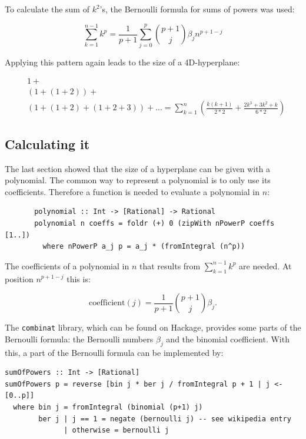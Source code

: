 \documentclass{tmr}
\begin{document}
To calculate the sum of $k^2$'s, the Bernoulli formula for sums of powers was used:

\begin{equation} \label{bernoulli}
\boxed{
\sum_{k=1}^{n-1} k^p = \frac{1}{p+1} \sum_{j=0}^{p} \binom{p+1}{j} \beta_{j} n^{p+1-j}
}
\end{equation}

Applying this pattern again leads to the size of a 4D-hyperplane:

\begin{equation}\label{poly4d}
\begin{split}
 & 1 +\\
 &(1+(1+2) )+ \\
 &(1+(1+2)+(1+2+3)) + ... = \sum_{k=1}^{n} (\frac{ k (k+1) }{2*2}  + \frac{2k^3+3k^2+k}{6*2})
\end{split}
\end{equation}

\subsection {Calculating it}

The last section showed that the size of a hyperplane can be given with a polynomial. The common way to represent a polynomial is to only use its coefficients. Therefore a function is needed to evaluate a polynomial in $n$:
\small
\begin{Verbatim}
       polynomial :: Int -> [Rational] -> Rational
       polynomial n coeffs = foldr (+) 0 (zipWith nPowerP coeffs [1..])
         where nPowerP a_j p = a_j * (fromIntegral (n^p))
\end{Verbatim}

The coefficients of a polynomial in $n$ that results from $\sum_{k=1}^{n-1} k^p$ are needed. At position $n^{p+1-j}$ this is:

\begin{equation} \label{coefficient}
\mbox{coefficient}(j) = \frac{1}{p+1} \binom{p+1}{j} \beta_{j}.
\end{equation}

The \verb|combinat| library, which can be found on Hackage, provides some parts of the Bernoulli formula: the Bernoulli numbers $\beta_{j}$ and the binomial coefficient. With this, a part of the Bernoulli formula can be implemented by:

\small
\begin{Verbatim}
sumOfPowers :: Int -> [Rational]
sumOfPowers p = reverse [bin j * ber j / fromIntegral p + 1 | j <- [0..p]]
  where bin j = fromIntegral (binomial (p+1) j)
        ber j | j == 1 = negate (bernoulli j) -- see wikipedia entry
              | otherwise = bernoulli j
\end{Verbatim}
\end{document}
